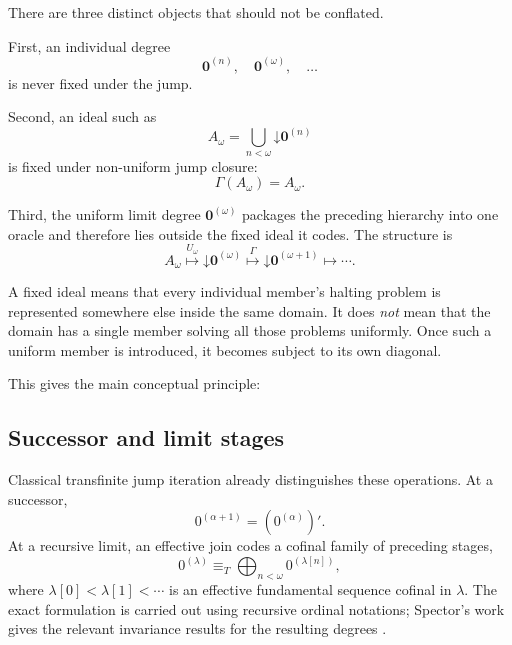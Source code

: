 \documentclass[11pt]{article}
\theoremstyle{definition}
\theoremstyle{remark}
\newcommand{\down}{\mathord{\downarrow}}
\newcommand{\bigjoin}{\bigoplus}
\newcommand{\equivT}{\equiv_T}
\begin{document}
There are three distinct objects that should not be conflated.

First, an individual degree
\[
\mathbf0^{(n)},\quad
\mathbf0^{(\omega)},\quad\ldots
\]
is never fixed under the jump.

Second, an ideal such as
\[
A_\omega
=
\bigcup_{n<\omega}\down\mathbf0^{(n)}
\]
is fixed under non-uniform jump closure:
\[
\Gamma(A_\omega)=A_\omega.
\]

Third, the uniform limit degree $\mathbf0^{(\omega)}$ packages the preceding hierarchy into one oracle and therefore lies outside the fixed ideal it codes. The structure is
\[
A_\omega
\overset{U_\omega}{\longmapsto}
\down\mathbf0^{(\omega)}
\overset{\Gamma}{\longmapsto}
\down\mathbf0^{(\omega+1)}
\longmapsto\cdots.
\]

A fixed ideal means that every individual member's halting problem is represented somewhere else inside the same domain. It does \emph{not} mean that the domain has a single member solving all those problems uniformly. Once such a uniform member is introduced, it becomes subject to its own diagonal.

This gives the main conceptual principle:
\begin{center}
\end{center}

\subsection{Successor and limit stages}

Classical transfinite jump iteration already distinguishes these operations. At a successor,
\begin{equation}
0^{(\alpha+1)}=(0^{(\alpha)})'.
\label{eq:transfinite-successor}
\end{equation}
At a recursive limit, an effective join codes a cofinal family of preceding stages,
\begin{equation}
0^{(\lambda)}\equivT
\bigjoin_{n<\omega}0^{(\lambda[n])},
\label{eq:transfinite-limit}
\end{equation}
where $\lambda[0]<\lambda[1]<\cdots$ is an effective fundamental sequence cofinal in $\lambda$. The exact formulation is carried out using recursive ordinal notations; Spector's work gives the relevant invariance results for the resulting degrees \cite{Spector1955,Slaman2005}.
\end{document}
